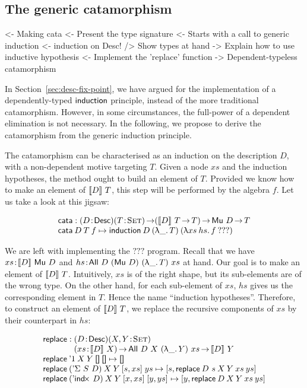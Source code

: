 \subsection{The generic catamorphism}

\begin{wstructure}
<- Making cata
    <- Present the type signature
    <- Starts with a call to generic induction
        <- induction on Desc!
        /> Show types at hand
        -> Explain how to use inductive hypothesis
    <- Implement the 'replace' function
    -> Dependent-typeless catamorphism 
\end{wstructure}

In Section~\ref{sec:desc-fix-point}, we have argued for the
implementation of a dependently-typed $\F{induction}$ principle,
instead of the more traditional catamorphism. However, in some
circumstances, the full-power of a dependent elimination is not
necessary. In the following, we propose to derive the catamorphism
from the generic induction principle. 

The catamorphism can be characterised as an induction on the
description $D$, with a non-dependent motive targeting $T$. Given a
node $xs$ and the induction hypotheses, the method ought to build an
element of $T$. Provided we know how to make an element of
$\descop{D}{T}$, this step will be performed by the algebra $f$. Let
us take a look at this jigsaw:

\newcommand{\cata}{\F{cata}}

\[\stk{
\cata : \PITEL{D}{\Desc}
           \PI{T}{\Set}
           (\descop{D}{T} \To T) \To 
           \Mu{D} \To T \\
\cata\: D\: T\: f \mapsto
  \F{induction}\: D\: (\LAM{\_}T)\: (\LAM{xs\:hs} f\: ???)
}\]

We are left with implementing the \(???\) program. Recall that we have
\(\Bhab{xs}{\descop{D}{\Mu{D}}}\) and
\(\Bhab{hs}{\All{D}{(\Mu{D})}{(\LAM{\_} T)}{xs}}\) at hand. Our goal
is to make an element of \(\descop{D}{T}\). Intuitively, $xs$ is of
the right shape, but its sub-elements are of the wrong type. On the
other hand, for each sub-element of $xs$, $hs$ gives us the
corresponding element in $T$. Hence the name ``induction
hypotheses''. Therefore, to construct an element of \(\descop{D}{T}\),
we replace the recursive components of \(xs\) by their counterpart in
\(hs\):


\[\stk{
\F{replace} : \stk{\PITEL{D}{\Desc}
                   \PITEL{X,Y}{\Set}\\
                   \PI{xs}{\descop{D}{X}} 
                   \All{D}{X}{(\LAM{\_}Y)}{xs} \To
                   \descop{D}{Y}} \\
\F{replace}\: \DUnit\:          X\: Y\: \Void\:          \Void          \mapsto \Void \\
\F{replace}\: (\DSigma{S}{D})\: X\: Y\: \pair{s}{xs}{}\: ys             \mapsto
    \pair{s}{\F{replace}\: {D~s}\: X\: Y\: xs\: ys}{}                                 \\
\F{replace}\: (\DIndx{D})\:     X\: Y\: \pair{x}{xs}{}\: \pair{y}{ys}{} \mapsto
    \pair{y}{\F{replace}\: D\: X\: Y\: xs\: ys}{}
}\]

